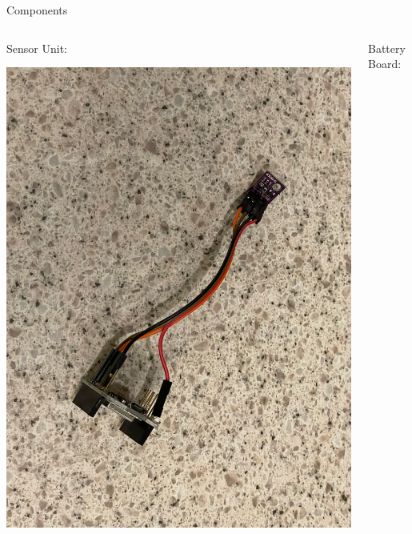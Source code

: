 \documentclass{beamer}
\begin{document}
  \begin{frame}{\sectitle}{Components}
    \begin{columns}
      \begin{column}{.5\textwidth}
        \centering Sensor Unit:
        \vspace*{1em}
        \begin{center}
          \includegraphics[scale=.1]{images/bme.png}
        \end{center}
      \end{column}
      \begin{column}{.5\textwidth}
        \centering Battery Board:
        \vspace*{1em}
        \begin{center}

\end{center}
\end{column}
\end{columns}
\end{frame}
\end{document}
